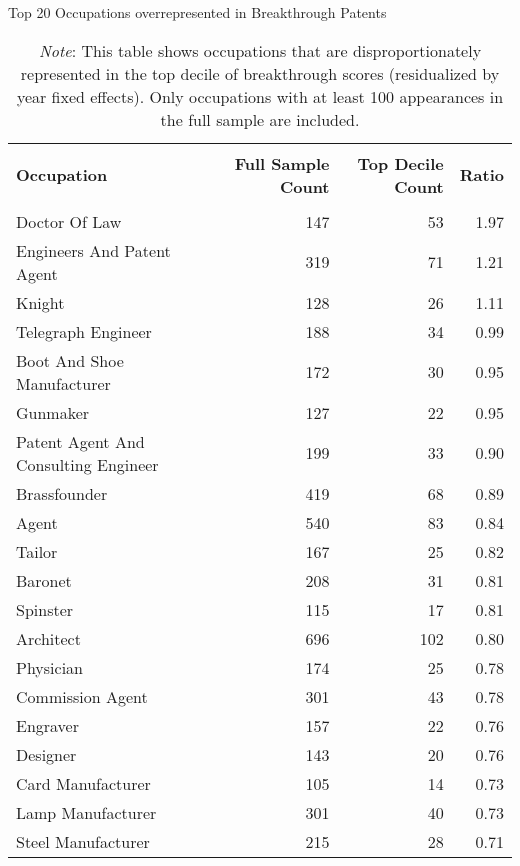 \begin{table}[H]
\centering
\renewcommand{\arraystretch}{0.8}
\caption{Top 20 Occupations overrepresented in Breakthrough Patents}
\label{tab:top_occ}
\begin{tabular}{lrrr}
\toprule
\\[-0.5em]
\textbf{Occupation} & \textbf{Full Sample Count} & \textbf{Top Decile Count} & \textbf{Ratio} \\
\\[-0.5em]
\midrule
Doctor Of Law & 147 & 53 & 1.97 \\
Engineers And Patent Agent & 319 & 71 & 1.21 \\
Knight & 128 & 26 & 1.11 \\
Telegraph Engineer & 188 & 34 & 0.99 \\
Boot And Shoe Manufacturer & 172 & 30 & 0.95 \\
Gunmaker & 127 & 22 & 0.95 \\
Patent Agent And Consulting Engineer & 199 & 33 & 0.90 \\
Brassfounder & 419 & 68 & 0.89 \\
Agent & 540 & 83 & 0.84 \\
Tailor & 167 & 25 & 0.82 \\
Baronet & 208 & 31 & 0.81 \\
Spinster & 115 & 17 & 0.81 \\
Architect & 696 & 102 & 0.80 \\
Physician & 174 & 25 & 0.78 \\
Commission Agent & 301 & 43 & 0.78 \\
Engraver & 157 & 22 & 0.76 \\
Designer & 143 & 20 & 0.76 \\
Card Manufacturer & 105 & 14 & 0.73 \\
Lamp Manufacturer & 301 & 40 & 0.73 \\
Steel Manufacturer & 215 & 28 & 0.71 \\
\midrule
\end{tabular}
\caption*{\textit{Note}: This table shows occupations that are disproportionately represented in the top decile of breakthrough scores (residualized by year fixed effects). Only occupations with at least 100 appearances in the full sample are included.}
\end{table}